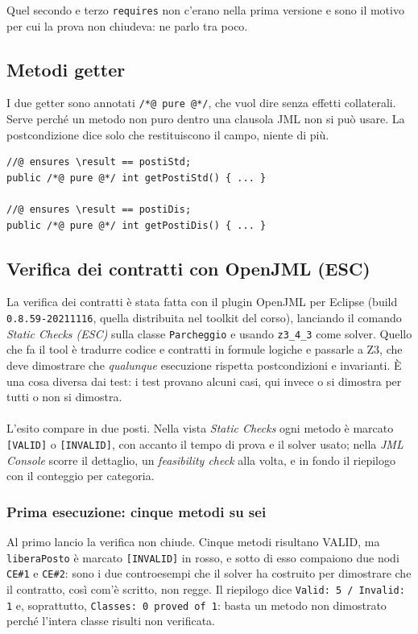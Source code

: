 Quel secondo e terzo \texttt{requires} non c'erano nella prima versione e sono il motivo
per cui la prova non chiudeva: ne parlo tra poco.

\subsection{Metodi getter}

I due getter sono annotati \texttt{/*@ pure @*/}, che vuol dire senza effetti
collaterali. Serve perché un metodo non puro dentro una clausola JML non si può usare. La
postcondizione dice solo che restituiscono il campo, niente di più.

\begin{lstlisting}[style=terminal, caption={Getter puri}]
//@ ensures \result == postiStd;
public /*@ pure @*/ int getPostiStd() { ... }

//@ ensures \result == postiDis;
public /*@ pure @*/ int getPostiDis() { ... }
\end{lstlisting}

\subsection{Verifica dei contratti con OpenJML (ESC)}

La verifica dei contratti è stata fatta con il plugin OpenJML per Eclipse
(build \texttt{0.8.59-20211116}, quella distribuita nel toolkit del corso), lanciando il
comando \emph{Static Checks (ESC)} sulla classe \texttt{Parcheggio} e usando \texttt{z3\_4\_3}
come solver. Quello che fa il tool è tradurre codice e
contratti in formule logiche e passarle a Z3, che deve dimostrare che
\emph{qualunque} esecuzione rispetta postcondizioni e invarianti. È una cosa diversa dai
test: i test provano alcuni casi, qui invece o si dimostra per tutti o non si dimostra.
\\ \\
L'esito compare in due posti. Nella vista \emph{Static Checks} ogni metodo è marcato
\texttt{[VALID]} o \texttt{[INVALID]}, con accanto il tempo di prova e il solver usato;
nella \emph{JML Console} scorre il dettaglio, un \emph{feasibility check} alla volta, e in
fondo il riepilogo con il conteggio per categoria.

\subsubsection{Prima esecuzione: cinque metodi su sei}

Al primo lancio la verifica non chiude. Cinque metodi risultano VALID, ma
\texttt{liberaPosto} è marcato \texttt{[INVALID]} in rosso, e sotto di esso compaiono due
nodi \texttt{CE\#1} e \texttt{CE\#2}: sono i due controesempi che il solver ha costruito
per dimostrare che il contratto, così com'è scritto, non regge. Il riepilogo dice
\texttt{Valid: 5 / Invalid: 1} e, soprattutto, \texttt{Classes: 0 proved of 1}: basta un
metodo non dimostrato perché l'intera classe risulti non verificata.

